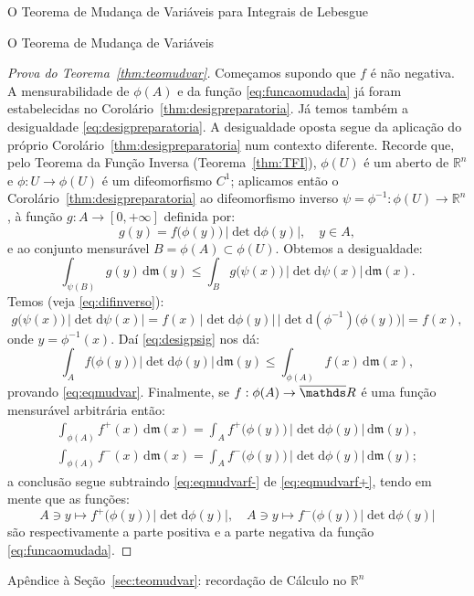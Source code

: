 \documentclass[oneside,final,11pt]{amsbook}
\newcommand{\R}{\mathds R}
\newcommand{\leb}{\mathfrak m}
\newcommand{\dd}{\mathrm d}
\theoremstyle{remark}\newtheorem{exercise}{Exercício}[chapter]
\theoremstyle{remark}\newtheorem{*exercise}[exercise]{\hbox to 0pt{\hskip 0pt minus 1fil*}Exercício}
\theoremstyle{definition}\newtheorem{exdefin}{Definição}[chapter]
\theoremstyle{plain}\newtheorem{teo}{Teorema}[section]
\theoremstyle{plain}\newtheorem{lem}[teo]{Lema}
\theoremstyle{plain}\newtheorem{prop}[teo]{Proposição}
\theoremstyle{plain}\newtheorem{cor}[teo]{Corolário}
\theoremstyle{definition}\newtheorem{defin}[teo]{Definição}
\theoremstyle{remark}\newtheorem{rem}[teo]{Observação}
\theoremstyle{definition}\newtheorem{notation}[teo]{Notação}
\theoremstyle{definition}\newtheorem{convention}[teo]{Convenção}
\theoremstyle{definition}\newtheorem{example}[teo]{Exemplo}
\numberwithin{section}{chapter}
\numberwithin{equation}{section}
\begin{document}
\begin{chapter}{O Teorema de Mudança de Variáveis para Integrais de Lebesgue}
\begin{section}{O Teorema de Mudança de Variáveis}
\begin{proof}[Prova do Teorema~\ref{thm:teomudvar}]
Começamos supondo que $f$ é não negativa. A mensurabilidade de $\phi(A)$ e da função
\eqref{eq:funcaomudada} já foram estabelecidas no Corolário~\ref{thm:desigpreparatoria}.
Já temos também a desigualdade \eqref{eq:desigpreparatoria}. A desigualdade oposta segue da
aplicação do próprio Corolário~\ref{thm:desigpreparatoria} num contexto diferente.
Recorde que, pelo Teorema da Função Inversa (Teorema~\ref{thm:TFI}), $\phi(U)$ é um aberto
de $\R^n$ e $\phi:U\to\phi(U)$ é um difeomorfismo $C^1$; aplicamos então o Corolário~\ref{thm:desigpreparatoria}
ao difeomorfismo inverso $\psi=\phi^{-1}:\phi(U)\to\R^n$, à função $g:A\to[0,+\infty]$ definida por:
\[g(y)=f\big(\phi(y)\big)\,\big\vert\det\dd\phi(y)\big\vert,\quad y\in A,\]
e ao conjunto mensurável $B=\phi(A)\subset\phi(U)$. Obtemos a desigualdade:
\begin{equation}\label{eq:desigpsig}
\int_{\psi(B)}g(y)\,\dd\leb(y)\le\int_Bg\big(\psi(x)\big)\,\big\vert\det\dd\psi(x)\big\vert\,\dd\leb(x).
\end{equation}
Temos (veja \eqref{eq:difinverso}):
\[g\big(\psi(x)\big)\,\big\vert\det\dd\psi(x)\big\vert
=f(x)\,\big\vert\det\dd\phi(y)\big\vert\,
\big\vert\det\dd(\phi^{-1})\big(\phi(y)\big)\big\vert=f(x),\]
onde $y=\phi^{-1}(x)$. Daí \eqref{eq:desigpsig} nos dá:
\[\int_Af\big(\phi(y)\big)\,\big\vert\det\dd\phi(y)\big\vert\,\dd\leb(y)\le
\int_{\phi(A)}f(x)\,\dd\leb(x),\]
provando \eqref{eq:eqmudvar}. Finalmente, se $f:\phi(A)\to\overline\R$
é uma função mensurável arbitrária então:
\begin{gather}
\int_{\phi(A)}f^+(x)\,\dd\leb(x)=\int_Af^+\big(\phi(y)\big)\,\big\vert\det\dd\phi(y)\big\vert\,\dd\leb(y),\label{eq:eqmudvarf+}\\
\int_{\phi(A)}f^-(x)\,\dd\leb(x)=\int_Af^-\big(\phi(y)\big)\,\big\vert\det\dd\phi(y)\big\vert\,\dd\leb(y);\label{eq:eqmudvarf-}
\end{gather}
a conclusão segue subtraindo \eqref{eq:eqmudvarf-} de \eqref{eq:eqmudvarf+}, tendo em mente que
as funções:
\[A\ni y\longmapsto f^+\big(\phi(y)\big)\,\big\vert\det\dd\phi(y)\big\vert,\quad
A\ni y\longmapsto f^-\big(\phi(y)\big)\,\big\vert\det\dd\phi(y)\big\vert\]
são respectivamente a parte positiva e a parte negativa da função \eqref{eq:funcaomudada}.
\end{proof}

\end{section}

\begin{section}[recordação de Cálculo no $\R^n$]{Apêndice à Seção~\ref{sec:teomudvar}: recordação de Cálculo no ${\R^n}$}
\label{sec:appCalculo}


\end{section}
\end{chapter}
\end{document}
